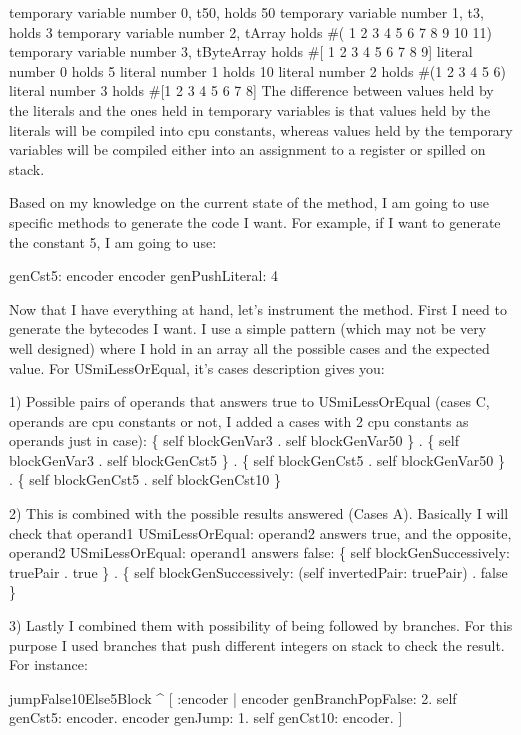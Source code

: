 \documentclass[a4paper,12pt,twoside]{../includes/ThesisStyle}
\begin{document}
temporary variable number 0, t50, holds 50
temporary variable number 1, t3, holds 3
temporary variable number 2, tArray holds \#( 1 2 3 4 5 6 7 8 9 10 11)
temporary variable number 3, tByteArray holds \#[ 1 2 3 4 5 6 7 8 9]
literal number 0 holds 5
literal number 1 holds 10
literal number 2 holds \#(1 2 3 4 5 6)
literal number 3 holds \#[1 2 3 4 5 6 7 8]
The difference between values held by the literals and the ones held in temporary variables is that values held by the literals will be compiled into cpu constants, whereas values held by the temporary variables will be compiled either into an assignment to a register or spilled on stack.

Based on my knowledge on the current state of the method, I am going to use specific methods to generate the code I want. For example, if I want to generate the constant 5, I am going to use:

genCst5: encoder
encoder genPushLiteral: 4

Now that I have everything at hand, let's instrument the method. First I need to generate the bytecodes I want. I use a simple pattern (which may not be very well designed) where I hold in an array all the possible cases and the expected value. For USmiLessOrEqual, it's cases description gives you:

1) Possible pairs of operands that answers true to USmiLessOrEqual (cases C, operands are cpu constants or not, I added a cases with 2 cpu constants as operands just in case):
\{ self blockGenVar3 . self blockGenVar50 \} .
\{ self blockGenVar3 . self blockGenCst5 \} .
\{ self blockGenCst5 . self blockGenVar50 \} .
\{ self blockGenCst5 . self blockGenCst10 \}

2) This is combined with the possible results answered (Cases A). Basically I will check that operand1 USmiLessOrEqual: operand2 answers true, and the opposite, operand2 USmiLessOrEqual: operand1 answers false:
\{ self blockGenSuccessively: truePair . true \} .
\{ self blockGenSuccessively: (self invertedPair: truePair) . false \}

3) Lastly I combined them with possibility of being followed by branches. For this purpose I used branches that push different integers on stack to check the result. For instance:

\begin{code}
jumpFalse10Else5Block
^ [ :encoder |
encoder genBranchPopFalse: 2.
self genCst5: encoder.
encoder genJump: 1.
self genCst10: encoder. ]
\end{code}
\end{document}
